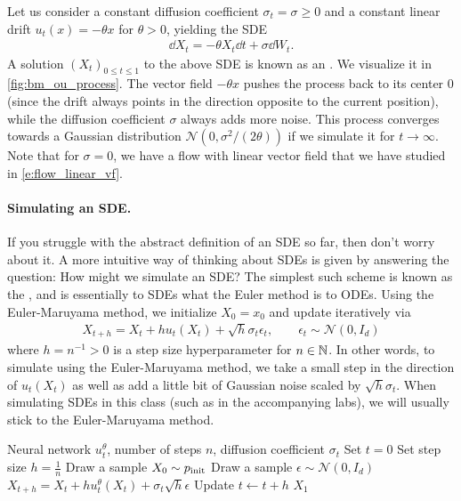 \begin{examplebox}
Let us consider a constant diffusion coefficient $\sigma_t=\sigma\geq 0$ and a constant linear drift $u_t(x)=-\theta x$ for $\theta>0$, yielding the SDE
\begin{align}
\label{eq:ohrstein_uhlenbeck_process}
\dd X_t = -\theta X_t\dd t + \sigma \dd W_t.
\end{align} 
A solution $(X_t)_{0 \le t \le 1}$ to the above SDE is known as an . We visualize it in \cref{fig:bm_ou_process}. The vector field $-\theta x$ pushes the process back to its center $0$ (since the drift always points in the direction opposite to the current position), while the diffusion coefficient $\sigma$ always adds more noise. This process converges towards a Gaussian distribution $\mathcal{N}(0,\sigma^2/(2\theta))$ if we simulate it for $t\to \infty$. Note that for $\sigma=0$, we have a flow with linear vector field that we have studied in \cref{e:flow_linear_vf}.
\end{examplebox}


\paragraph{Simulating an SDE.} If you struggle with the abstract definition of an SDE so far, then don't worry about it. A more intuitive way of thinking about SDEs is given by answering the question: How might we simulate an SDE? The simplest such scheme is known as the , and is essentially to SDEs what the Euler method is to ODEs. Using the Euler-Maruyama method, we initialize $X_0=x_0$ and update iteratively via
\begin{align}
\label{e:euler_method_sdes}
    X_{t+h} = X_{t}+hu_t(X_t) + \sqrt{h}\sigma_t\epsilon_t,\quad \quad \epsilon_t \sim \mathcal{N}(0,I_d)
\end{align}
where $h=n^{-1}>0$ is a step size hyperparameter for $n \in \mathbb N$. In other words, to simulate using the Euler-Maruyama method, we take a small step in the direction of $u_t(X_t)$ as well as add a little bit of Gaussian noise scaled by $\sqrt{h}\sigma_t$. When simulating SDEs in this class (such as in the accompanying labs), we will usually stick to the Euler-Maruyama method.

\begin{algorithm}[ht]
\caption{Sampling from a Diffusion Model (Euler-Maruyama  method)}
\label{alg:sampling_diffusion_model}
\begin{algorithmic}[1]
\REQUIRE Neural network $u_t^\theta$, number of steps $n$, diffusion coefficient $\sigma_t$
\STATE Set $t=0$
\STATE Set step size $h=\frac{1}{n}$
\STATE Draw a sample $X_0\sim p_{\rm{init}}$
    \STATE Draw a sample $\epsilon\sim \mathcal{N}(0,I_d)$
    \STATE $X_{t+h} = X_{t} + h u_t^\theta(X_t)+\sigma_t\sqrt{h}\epsilon$
    \STATE Update $t\leftarrow t+h$
\ENDFOR
\RETURN $X_1$
\end{algorithmic}
\end{algorithm}

